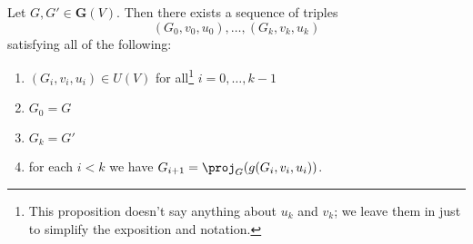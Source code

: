 \begin{proposition}
Let $G,G' \in \mathbf{G}(V)$.
Then there exists a sequence of triples
\[ (G_0, v_0, u_0), \ldots, (G_k, v_k, u_k) \]
satisfying all of the following:
\begin{enumerate}[nosep,label=(\roman*)]
    \item\label{itm:g-iter-first-condition} $(G_i, v_i, u_i) \in U(V)$ for all\footnote{
            This proposition doesn't say anything about $u_k$ and $v_k$; we leave them in just to simplify the exposition and notation.
        } $i = 0,\ldots,k-1$
    \item $G_0 = G$
    \item $G_k = G'$
    \item\label{itm:g-iter-recursion} for each $i < k$ we have $G_{i+1} = \proj_G(g(G_i, v_i, u_i))$.
\end{enumerate}
\label{prop:g-iter-is-irreducible}
\end{proposition}

